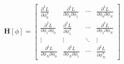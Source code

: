 \documentclass[border=4pt]{standalone}
\begin{document}
$
 \mathbf{H}[\phi] = \begin{bmatrix} \frac{\partial^2 L}{\partial \phi_0^2} & \frac{\partial^2 L}{\partial \phi_0 \partial \phi_1} &\cdots & \frac{\partial^2 L}{\partial \phi_0 \partial \phi_N} \\[2pt] \frac{\partial^2 L}{\partial \phi_1 \partial \phi_0} & \frac{\partial^2 L}{\partial \phi_1^2} & \cdots & \frac{\partial^2 L}{\partial \phi_1 \partial \phi_N} \\[2pt] \vdots & \vdots & \ddots & \vdots \\[2pt] \frac{\partial^2 L}{\partial \phi_N \partial \phi_0} & \frac{\partial^2 L}{\partial \phi_N \partial \phi_1} & \cdots &\frac{\partial^2 L}{\partial \phi_N^2} \end{bmatrix} $
\end{document}
